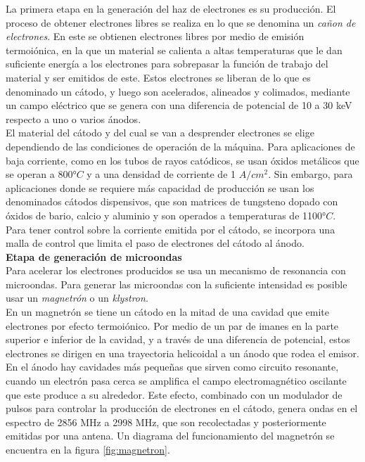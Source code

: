 La primera etapa en la generación del haz de electrones es su producción. El proceso de obtener electrones libres se realiza en lo que se denomina un \textit{cañon de electrones}. En este se obtienen electrones libres por medio de emisión termoiónica, en la que un material se calienta a altas temperaturas que le dan suficiente energía a los electrones para sobrepasar la función de trabajo del material y ser emitidos de este. Estos electrones se liberan de lo que es denominado un cátodo, y luego son acelerados, alineados y colimados, mediante un campo eléctrico que se genera con una diferencia de potencial de 10 a 30 keV respecto a uno o varios ánodos.\\

El material del cátodo y del cual se van a desprender electrones se elige dependiendo de las condiciones de operación de la máquina. Para aplicaciones de baja corriente, como en los tubos de rayos catódicos, se usan óxidos metálicos que se operan a 800°$C$ y a una densidad de corriente de 1 $A/cm^2$. Sin embargo, para aplicaciones donde se requiere más capacidad de producción se usan los denominados cátodos dispensivos, que son matrices de tungsteno dopado con óxidos de bario, calcio y aluminio y son operados a temperaturas de 1100°$C$\cite{karzmark1993medical}.\\ 

Para tener control sobre la corriente emitida por el cátodo, se incorpora una malla de control que limita el paso de electrones del cátodo al ánodo.\\

\textbf{Etapa de generación de microondas}\\

Para acelerar los electrones producidos se usa un mecanismo de resonancia con microondas. Para generar las microondas con la suficiente intensidad es posible usar un \textit{magnetrón} o un \textit{klystron}\cite{karzmark1993medical}.\\

En un magnetrón se tiene un cátodo en la mitad de una cavidad que emite electrones por efecto termoiónico. Por medio de un par de imanes en la parte superior e inferior de la cavidad, y a través de una diferencia de potencial, estos electrones se dirigen en una trayectoria helicoidal a un ánodo que rodea el emisor. En el ánodo hay cavidades más pequeñas que sirven como circuito resonante, cuando un electrón pasa cerca se amplifica el campo electromagnético oscilante que este produce a su alrededor. Este efecto, combinado con un modulador de pulsos para controlar la producción de electrones en el cátodo, genera ondas en el espectro de 2856 MHz a 2998 MHz\cite{karzmark1993medical}, que son recolectadas y posteriormente emitidas por una antena. Un diagrama del funcionamiento del magnetrón se encuentra en la figura \ref{fig:magnetron}.\\

